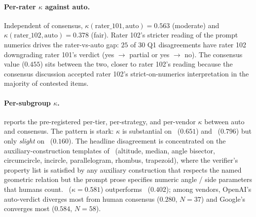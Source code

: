 \paragraph{Per-rater $\kappa$ against auto.}
Independent of consensus, $\kappa(\text{rater\_101}, \text{auto}) = 0.563$ (moderate) and $\kappa(\text{rater\_102}, \text{auto}) = 0.378$ (fair).
Rater 102's stricter reading of the prompt numerics drives the rater-vs-auto gap: $25$ of $30$ Q1 disagreements have rater 102 downgrading rater 101's verdict (yes $\to$ partial or yes $\to$ no).
The consensus value ($0.455$) sits between the two, closer to rater 102's reading because the consensus discussion accepted rater 102's strict-on-numerics interpretation in the majority of contested items.

\paragraph{Per-subgroup $\kappa$.}
 reports the pre-registered per-tier, per-strategy, and per-vendor $\kappa$ between auto and consensus.
The pattern is stark: $\kappa$ is substantial on \tone\ ($0.651$) and \tthree\ ($0.796$) but only \emph{slight} on \ttwo\ ($0.160$).
The headline disagreement is concentrated on the auxiliary-construction templates of \ttwo\ (altitude, median, angle bisector, circumcircle, incircle, parallelogram, rhombus, trapezoid), where the verifier's property list is satisfied by any auxiliary construction that respects the named geometric relation but the prompt prose specifies numeric angle / side parameters that humans count.
\structured\ ($\kappa = 0.581$) outperforms \rawcode\ ($0.402$); among vendors, OpenAI's auto-verdict diverges most from human consensus ($0.280$, $N{=}37$) and Google's converges most ($0.584$, $N{=}58$).

